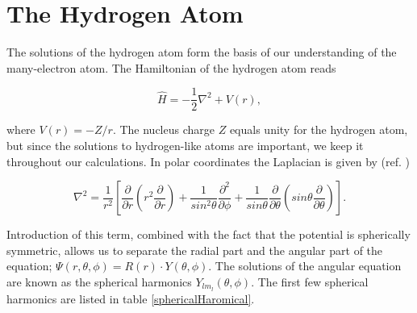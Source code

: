 \section{The Hydrogen Atom}
\label{TheHydrogenAtom}

The solutions of the hydrogen atom form the basis of our
understanding of the many-electron atom. The Hamiltonian of the
hydrogen atom reads 

\begin{equation}
  \hat{H} = -\frac{1}{2} \nabla^2  + V(r),
  \label{HydrogenHamiltonian}
\end{equation}

where $V(r) = - Z/r$. The nucleus charge $Z$ equals unity for the
hydrogen atom, but since the solutions to hydrogen-like atoms are
important, we keep it throughout our calculations. In polar coordinates
the Laplacian is given by (ref. \cite{rottmann2003})

\begin{equation}
  \nabla^2 = \frac{1}{r^2}\left[
    \frac{\partial}{\partial r} \left( r^2 \frac{\partial}{\partial r}\right)+
    \frac{1}{sin^2 \theta} \frac{\partial^2}{\partial \phi}+
    \frac{1}{sin \theta}\frac{\partial}{\partial \theta} \left( sin \theta
    \frac{\partial}{\partial \theta} \right)
    \right].
\label{laplacianRottmann}
\end{equation}

Introduction of this term, combined with the fact that the potential is
spherically symmetric, allows us to separate the radial part and the
angular part of the equation; $\Psi(r,\theta, \phi) =
R(r) \cdot Y(\theta,\phi)$. The solutions of the angular equation are
known as the spherical harmonics $Y_{lm_l}(\theta, \phi)$. The first
few spherical harmonics are listed in table \ref{sphericalHaromical}.
\newline

